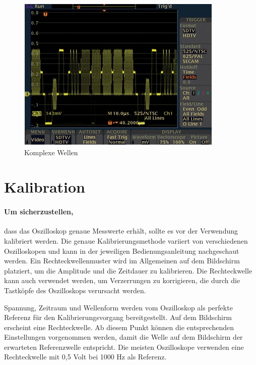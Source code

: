 \documentclass{article}
\begin{document}
\begin{figure}[H]
  \includegraphics[width=\textwidth]{"KomplexeWave"}
  \caption[\textbf{KomplexeWave.jpg},  Quelle:https://www.tek.com/document/online/primer/xyzs-scopes/ch1/oscilloscope-basics (zuletzt abgerufen: 04.09.2021)]{Komplexe Wellen}
\end{figure}
\newline
\section{Kalibration}
\paragraph{Um sicherzustellen,}
 dass das Oszilloskop genaue Messwerte erhält, sollte es vor der Verwendung kalibriert werden. Die genaue Kalibrierungsmethode variiert von verschiedenen Oszilloskopen und kann in der jeweiligen Bedienungsanleitung nachgeschaut werden. Ein Rechteckwellenmuster wird im Allgemeinen auf dem Bildschirm platziert, um die Amplitude und die Zeitdauer zu kalibrieren. Die Rechteckwelle kann auch verwendet werden, um Verzerrungen zu korrigieren, die durch die Tastköpfe des Oszilloskops verursacht werden.

Spannung, Zeitraum und Wellenform werden vom Oszilloskop als perfekte Referenz für den Kalibrierungsvorgang bereitgestellt. Auf dem Bildschirm erscheint eine Rechteckwelle. Ab diesem Punkt können die entsprechenden Einstellungen vorgenommen werden, damit die Welle auf dem Bildschirm der erwarteten Referenzwelle entspricht. Die meisten Oszilloskope verwenden eine Rechteckwelle mit 0,5 Volt bei 1000 Hz als Referenz. 
\end{document}
